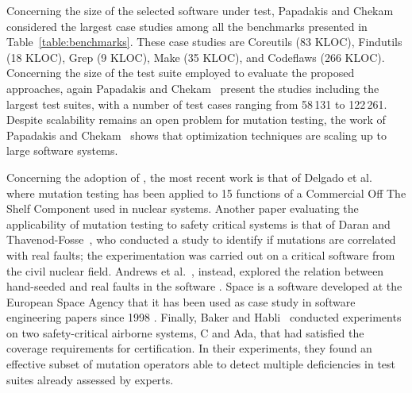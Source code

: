 Concerning the size of the selected software under test, Papadakis and Chekam~\cite{papadakis2018mutation,chekam2017empirical,papadakis2018mutant} considered the largest case studies among all the benchmarks presented in Table~\ref{table:benchmarks}. These case studies are Coreutils (83 KLOC), Findutils (18 KLOC), Grep (9 KLOC), Make (35 KLOC), and Codeflaws (266 KLOC). 
Concerning the size of the test suite employed to evaluate the proposed approaches, again Papadakis and Chekam~\cite{papadakis2018mutation,chekam2017empirical,papadakis2018mutant} present the studies including the largest test suites, with a number of test cases ranging from 58\,131 to 122\,261.
Despite scalability remains an open problem for mutation testing, the work of Papadakis and Chekam~\cite{papadakis2018mutation,chekam2017empirical,papadakis2018mutant} shows that optimization techniques are scaling up to large software systems.

Concerning the adoption of , the most recent work is that of Delgado et al.~\cite{delgado2018evaluation} where mutation testing has been applied to 15 functions of a Commercial Off The Shelf Component used in nuclear systems. 
Another paper evaluating the applicability of mutation testing to safety critical systems is that of Daran and Thavenod-Fosse~\cite{daran1996software}, who conducted a study to identify if mutations are correlated with real faults; the experimentation was carried out on a critical software from the civil nuclear field. 
Andrews et al.~\cite{andrews2005mutation}, instead, explored the relation between hand-seeded and real faults in the software . Space is a software developed at the European Space Agency that it has been used as case study in software engineering papers since 1998 \cite{frankl1998further}.
Finally,  Baker and Habli~\cite{baker2012empirical} conducted experiments on two safety-critical airborne systems, C and Ada, that had satisfied the coverage requirements for certification. In their experiments, they found an effective subset of mutation operators able to detect multiple deficiencies in test suites already assessed by experts. 



